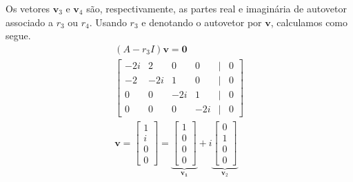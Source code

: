 \begin{resol}
\begin{enumerate}[a)]
    Os vetores $\pmb{v}_3$ e $\pmb{v}_4$ são, respectivamente, as partes real e imaginária de autovetor associado a $r_3$ ou $r_4$. Usando $r_3$ e denotando o autovetor por $\pmb{v}$, calculamos como segue.
    \begin{gather}
      (A-r_3I)\pmb{v} = \pmb{0} \\
      \begin{bmatrix}
        -2i & 2 & 0 & 0 & | & 0 \\
        -2 & -2i & 1 & 0 & | & 0 \\
        0 & 0 & -2i & 1 & | & 0 \\
        0 & 0 & 0 & -2i & | & 0
      \end{bmatrix}\\
      \pmb{v} =
      \begin{bmatrix}
        1 \\
        i \\
        0 \\
        0
      \end{bmatrix} =
      \underbrace{\begin{bmatrix}
        1 \\
        0 \\
        0 \\
        0
      \end{bmatrix}}_{\pmb{v_1}} + i
    \underbrace{\begin{bmatrix}
        0 \\
        1 \\
        0 \\
        0
      \end{bmatrix}}_{\pmb{v}_2}
    \end{gather}
  \end{enumerate}


\end{resol}
